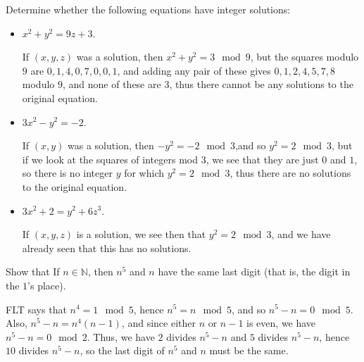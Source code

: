 \documentclass[11pt,dvipsnames]{book}
\numberwithin{figure}{section} %
\numberwithin{table}{section} %
\begin{document}
\begin{exercise} Determine whether the following equations have integer solutions:
\begin{itemize}
\item $x^2+y^2=9z+3$.

\begin{solution}
If $(x,y,z)$ was a solution, then $x^2+y^2 = 3\mod 9$, but the squares modulo $9$ are $0,1,4,0,7,0,0,1$, and adding any pair of these gives $0,1,2,4,5,7,8$ modulo $9$, and none of these are $3$, thus there cannot be any solutions to the original equation.
\end{solution}

\item $3x^2-y^2=-2$.

\begin{solution}
If $(x,y)$ was a solution, then $-y^2 = -2\mod 3$,and so $y^2 = 2\mod 3$, but if we look at the squares of integers mod 3, we see that they are just $0$ and $1$, so there is no integer $y$ for which $y^2 = 2 \mod 3$, thus there are no solutions to the original equation.
\end{solution}

\item $3x^2+2=y^2+6z^3$.

\begin{solution}
If $(x,y,z)$ is a  solution, we see then that $y^2 = 2\mod 3$, and we have already seen that this has no solutions.

\end{solution}

\end{itemize}

\end{exercise}

\begin{exercise} Show that If $n\in\mathbb{N}$, then $n^5$ and $n$ have the same last digit (that is, the digit in the $1$'s place).

\begin{solution}
FLT says that $n^{4} = 1 \mod 5$, hence $n^{5} = n \mod 5$, and so $n^{5}-n = 0\mod 5$. Also, $n^5-n=n^4(n-1)$, and since either $n$ or $n-1$ is even, we have $n^5-n = 0\mod 2$. Thus, we have $2$ divides $n^5-n$ and $5$ divides $ n^5-n$, hence $10$ divides $n^5-n$, so the last digit of $n^5$ and $n$ must be the same.
\end{solution}

\end{exercise}
\end{document}
